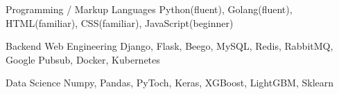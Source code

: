 

\begin{cvskills}


  \cvskill
    {Programming / Markup Languages} %
    {Python(fluent), Golang(fluent), HTML(familiar), CSS(familiar), JavaScript(beginner)} %

  \cvskill
    {Backend Web Engineering} %
    {Django, Flask, Beego, MySQL, Redis, RabbitMQ, Google Pubsub, Docker, Kubernetes} %

  \cvskill
    {Data Science}
    {Numpy, Pandas, PyToch, Keras, XGBoost, LightGBM, Sklearn}



\end{cvskills}
